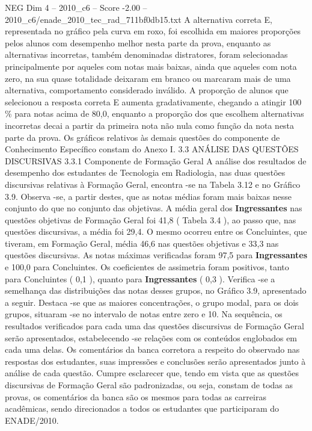 \begin{textsample}{NEG Dim 4 – 2010\_c6 – Score -2.00 – 2010\_c6/enade\_2010\_tec\_rad\_711bf0db15.txt}
A alternativa correta E, representada no gráfico pela curva em roxo, foi escolhida em maiores proporções pelos alunos com desempenho melhor nesta parte da prova, enquanto as alternativas incorretas, também denominadas distratores, foram selecionadas principalmente por aqueles com notas mais baixas, ainda que aqueles com nota zero, na sua quase totalidade deixaram em branco ou marcaram mais de uma alternativa, comportamento considerado inválido.
A proporção de alunos que selecionou a resposta correta E aumenta gradativamente, chegando a atingir 100 \% para notas acima de 80,0, enquanto a proporção dos que escolhem alternativas incorretas decai a partir da primeira nota não nula como função da nota nesta parte da prova.
Os gráficos relativos às demais questões do componente de Conhecimento Específico constam do Anexo I. 3.3 ANÁLISE DAS QUESTÕES DISCURSIVAS 3.3.1 Componente de Formação Geral A análise dos resultados de desempenho dos estudantes de Tecnologia em Radiologia, nas duas questões discursivas relativas à Formação Geral, encontra -se na Tabela 3.12 e no Gráfico 3.9.
Observa -se, a partir destes, que as notas médias foram mais baixas nesse conjunto do que no conjunto das objetivas.
A média geral dos \textbf{Ingressantes} nas questões objetivas de Formação Geral foi 41,8 ( Tabela 3.4 ), ao passo que, nas questões discursivas, a média foi 29,4.
O mesmo ocorreu entre os Concluintes, que tiveram, em Formação Geral, média 46,6 nas questões objetivas e 33,3 nas questões discursivas.
As notas máximas verificadas foram 97,5 para \textbf{Ingressantes} e 100,0 para Concluintes.
Os coeficientes de assimetria foram positivos, tanto para Concluintes ( 0,1 ), quanto para \textbf{Ingressantes} ( 0,3 ).
Verifica -se a semelhança das distribuições das notas desses grupos, no Gráfico 3.9, apresentado a seguir.
Destaca -se que as maiores concentrações, o grupo modal, para os dois grupos, situaram -se no intervalo de notas entre zero e 10.
Na sequência, os resultados verificados para cada uma das questões discursivas de Formação Geral serão apresentados, estabelecendo -se relações com os conteúdos englobados em cada uma delas.
Os comentários da banca corretora a respeito do observado nas respostas dos estudantes, suas impressões e conclusões serão apresentados junto à análise de cada questão.
Cumpre esclarecer que, tendo em vista que as questões discursivas de Formação Geral são padronizadas, ou seja, constam de todas as provas, os comentários da banca são os mesmos para todas as carreiras acadêmicas, sendo direcionados a todos os estudantes que participaram do ENADE/2010.

\end{textsample}
